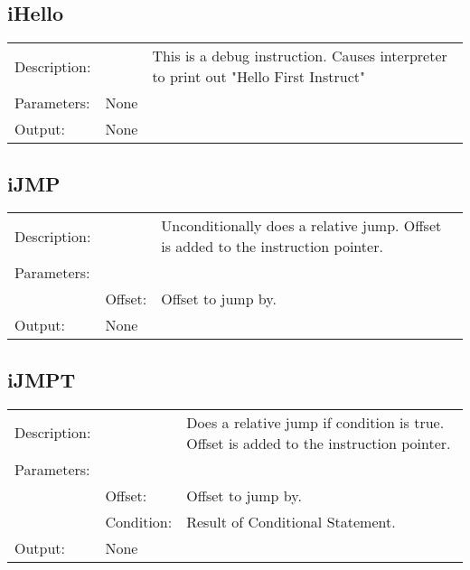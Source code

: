 \subsection{iHello}
\begin{tabular}{l l p{10cm}}
Description: & ~    & This is a debug instruction. Causes interpreter to print out "Hello First Instruct"\\
Parameters:  & None & ~                                                                                   \\
Output:      & None & ~                                                                                   \\
\end{tabular}


\subsection{iJMP}
\begin{tabular}{l l p{10cm}}
Description: & ~    & Unconditionally does a relative jump. Offset is added to the instruction pointer.\\
Parameters:  & ~ & ~                                                                                   \\
~			 & Offset: & Offset to jump by.\\
Output:      & None & ~                                                                                   \\
\end{tabular}

\subsection{iJMPT}
\begin{tabular}{l l p{10cm}}
Description: & ~    & Does a relative jump if condition is true. Offset is added to the instruction pointer.\\
Parameters:  & ~ & ~                                                                                   \\
~			 & Offset: & Offset to jump by.\\
~			 & Condition: & Result of Conditional Statement.\\
Output:      & None & ~                                                                                   \\
\end{tabular}

